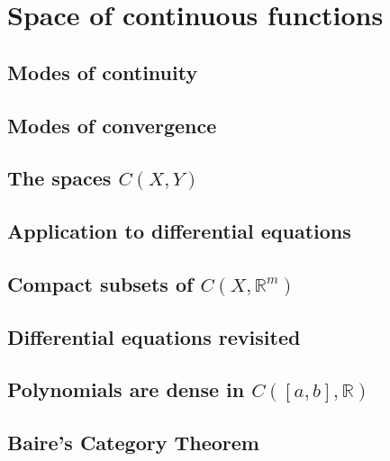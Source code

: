 \chapter{Space of continuous functions}

\section{Modes of continuity}
\section{Modes of convergence}
\section{The spaces \(C \left( X, Y \right)\)}
\section{Application to differential equations}
\section{Compact subsets of \( C\left( X, \mathbb{R}^m \right) \)}
\section{Differential equations revisited}
\section{Polynomials are dense in \( C\left( \left[ a, b \right], \mathbb{R} \right) \)}
\section{Baire's Category Theorem}

